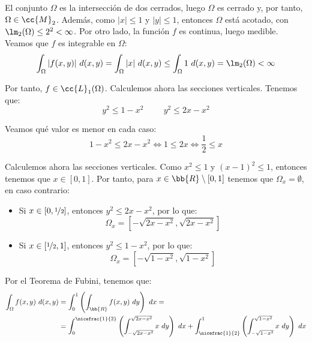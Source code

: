 \begin{ejercicio}
\begin{enumerate}
        El conjunto $\Omega$ es la intersección de dos cerrados, luego $\Omega$ es cerrado y, por tanto, $\Omega\in \cc{M}_2$.
        Además, como $|x|\leq 1$ y $|y|\leq 1$, entonces $\Omega$ está acotado, con $\lm_2(\Omega)\leq 2^2 < \infty$.
        Por otro lado, la función $f$ es continua, luego medible. Veamos que $f$ es integrable en $\Omega$:
        \begin{equation*}
            \int_{\Omega} |f(x, y)|~d(x, y)
            = \int_{\Omega} |x|~d(x, y) \leq \int_{\Omega} 1~d(x, y) = \lm_2(\Omega) < \infty
        \end{equation*}

        Por tanto, $f\in \cc{L}_1(\Omega)$. Calculemos ahora las secciones verticales.
        Tenemos que:
        \begin{equation*}
            y^2\leq 1-x^2 \hspace{1cm} y^2\leq 2x-x^2
        \end{equation*}

        Veamos qué valor es menor en cada caso:
        \begin{equation*}
            1-x^2 \leq 2x-x^2 \iff 1 \leq 2x \iff \frac{1}{2} \leq x
        \end{equation*}

        Calculemos ahora las secciones verticales. Como $x^2\leq 1$ y $(x-1)^2\leq 1$, entonces tenemos que
        $x\in [0,1]$. Por tanto, para $x\in \bb{R}\setminus [0,1]$ tenemos que $\Omega_x=\emptyset$, en caso contrario:
        \begin{itemize}
            \item Si $x\in [0,\nicefrac{1}{2}]$, entonces $y^2\leq 2x-x^2$, por lo que:
            \begin{equation*}
                \Omega_x = \left[ -\sqrt{2x-x^2}, \sqrt{2x-x^2} \right]
            \end{equation*}

            \item Si $x\in [\nicefrac{1}{2},1]$, entonces $y^2\leq 1-x^2$, por lo que:
            \begin{equation*}
                \Omega_x = \left[ -\sqrt{1-x^2}, \sqrt{1-x^2} \right]
            \end{equation*}
        \end{itemize}
        
        Por el Teorema de Fubini, tenemos que:
        \begin{align*}
            \int_{\Omega} f(x, y)~d(x, y) &= \int_{0}^{1} \left( \int_{\bb{R}} f(x,y)~dy \right)~dx =\\
            &= \int_{0}^{\nicefrac{1}{2}} \left( \int_{-\sqrt{2x-x^2}}^{\sqrt{2x-x^2}} x~dy \right)~dx +
            \int_{\nicefrac{1}{2}}^{1} \left( \int_{-\sqrt{1-x^2}}^{\sqrt{1-x^2}} x~dy \right)~dx
        \end{align*}


\end{enumerate}
\end{ejercicio}
